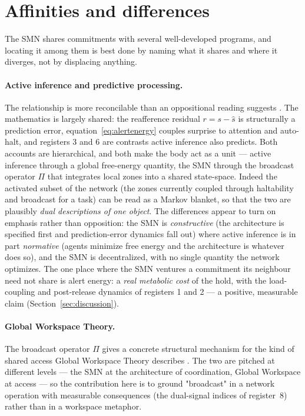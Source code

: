 \documentclass[utf8]{FrontiersinHarvard}
\begin{document}
\section{Affinities and differences}\label{sec:affinities}

The SMN shares commitments with several well-developed programs, and locating it among them is best done by naming what it shares and where it diverges, not by displacing anything.

\paragraph{Active inference and predictive processing.} The relationship is more reconcilable than an oppositional reading suggests \citep{Friston2010FreeEnergyPrinciple,ParrPezzuloFriston2022}. The mathematics is largely shared: the reafference residual $r=s-\hat s$ is structurally a prediction error, equation~\eqref{eq:alertenergy} couples surprise to attention and auto-halt, and registers 3 and 6 are contrasts active inference also predicts. Both accounts are hierarchical, and both make the body act as a unit --- active inference through a global free-energy quantity, the SMN through the broadcast operator $\Pi$ that integrates local zones into a shared state-space. Indeed the activated subset of the network (the zones currently coupled through haltability and broadcast for a task) can be read as a Markov blanket, so that the two are plausibly \emph{dual descriptions of one object}. The differences appear to turn on emphasis rather than opposition: the SMN is \emph{constructive} (the architecture is specified first and prediction-error dynamics fall out) where active inference is in part \emph{normative} (agents minimize free energy and the architecture is whatever does so), and the SMN is decentralized, with no single quantity the network optimizes. The one place where the SMN ventures a commitment its neighbour need not share is alert energy: a \emph{real metabolic cost} of the hold, with the load-coupling and post-release dynamics of registers 1 and 2 --- a positive, measurable claim (Section~\ref{sec:discussion}).

\paragraph{Global Workspace Theory.} The broadcast operator $\Pi$ gives a concrete structural mechanism for the kind of shared access Global Workspace Theory describes \citep{Baars2005GlobalWorkspace,Dehaene2014Consciousness}. The two are pitched at different levels --- the SMN at the architecture of coordination, Global Workspace at access --- so the contribution here is to ground "broadcast" in a network operation with measurable consequences (the dual-signal indices of register~8) rather than in a workspace metaphor.
\end{document}
